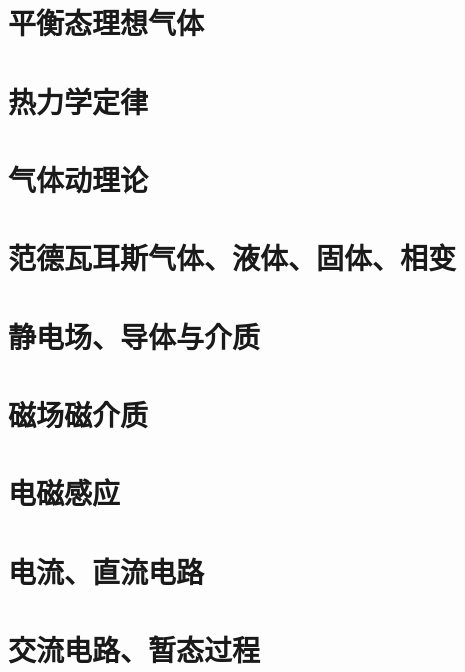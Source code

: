 \documentclass[12pt]{book}
\begin{document}


\chapter{平衡态理想气体}
\newpage



\chapter{热力学定律}
\newpage



\chapter{气体动理论}
\newpage


\chapter{范德瓦耳斯气体、液体、固体、相变}
\newpage


\chapter{静电场、导体与介质}
\newpage



\chapter{磁场磁介质}
\newpage



\chapter{电磁感应}
\newpage



\chapter{电流、直流电路}
\newpage



\chapter{交流电路、暂态过程}
\newpage

\end{document}
